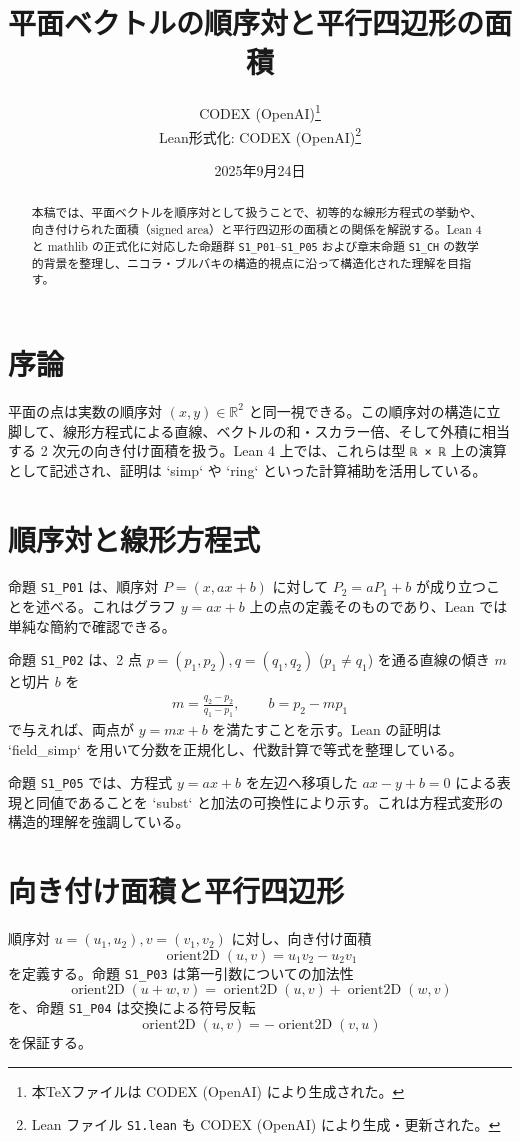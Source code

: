\documentclass[12pt]{ltjsarticle}
\title{平面ベクトルの順序対と平行四辺形の面積}
\author{CODEX (OpenAI)\thanks{本TeXファイルは CODEX (OpenAI) により生成された。}\\Lean形式化: CODEX (OpenAI)\thanks{Lean ファイル \texttt{S1.lean} も CODEX (OpenAI) により生成・更新された。}}
\date{2025年9月24日}
\begin{document}
\maketitle

\begin{abstract}
本稿では、平面ベクトルを順序対として扱うことで、初等的な線形方程式の挙動や、向き付けられた面積（signed area）と平行四辺形の面積との関係を解説する。Lean 4 と mathlib の正式化に対応した命題群 \texttt{S1\_P01}--\texttt{S1\_P05} および章末命題 \texttt{S1\_CH} の数学的背景を整理し、ニコラ・ブルバキの構造的視点に沿って構造化された理解を目指す。
\end{abstract}

\section{序論}
平面の点は実数の順序対 $(x,y) \in \mathbb{R}^2$ と同一視できる。この順序対の構造に立脚して、線形方程式による直線、ベクトルの和・スカラー倍、そして外積に相当する 2 次元の向き付け面積を扱う。Lean 4 上では、これらは型 \texttt{ℝ × ℝ} 上の演算として記述され、証明は `simp` や `ring` といった計算補助を活用している。

\section{順序対と線形方程式}
命題 \texttt{S1\_P01} は、順序対 $P=(x,ax+b)$ に対して $P_2 = a P_1 + b$ が成り立つことを述べる。これはグラフ $y=ax+b$ 上の点の定義そのものであり、Lean では単純な簡約で確認できる。

命題 \texttt{S1\_P02} は、2 点 $p=(p_1,p_2), q=(q_1,q_2)$ ($p_1\ne q_1$) を通る直線の傾き $m$ と切片 $b$ を
\begin{align}
 m = \frac{q_2 - p_2}{q_1 - p_1}, \qquad b = p_2 - m p_1
\end{align}
で与えれば、両点が $y = m x + b$ を満たすことを示す。Lean の証明は `field_simp` を用いて分数を正規化し、代数計算で等式を整理している。

命題 \texttt{S1\_P05} では、方程式 $y = a x + b$ を左辺へ移項した $a x - y + b = 0$ による表現と同値であることを `subst` と加法の可換性により示す。これは方程式変形の構造的理解を強調している。

\section{向き付け面積と平行四辺形}
順序対 $u=(u_1,u_2), v=(v_1,v_2)$ に対し、向き付け面積
\begin{equation}
 \operatorname{orient2D}(u,v) = u_1 v_2 - u_2 v_1
\end{equation}
を定義する。命題 \texttt{S1\_P03} は第一引数についての加法性
\begin{equation}
 \operatorname{orient2D}(u+w,v) = \operatorname{orient2D}(u,v) + \operatorname{orient2D}(w,v)
\end{equation}
を、命題 \texttt{S1\_P04} は交換による符号反転
\begin{equation}
 \operatorname{orient2D}(u,v) = -\operatorname{orient2D}(v,u)
\end{equation}
を保証する。
\end{document}
